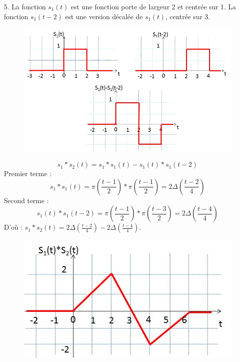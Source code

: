 \documentclass[11pt]{report}
\begin{document}
	5. La fonction $s_{1}(t)$ est une fonction porte de largeur 2 et centrée sur 1. La fonction $s_{1}(t-2)$ est une version décalée de $s_{1}(t)$, centrée sur 3.
	
	\begin{figure}[h!]
		\centering
		\includegraphics[scale=0.6]{images/TD_7_exo6.jpg} 
	\end{figure}

	\begin{equation*}
	s_{1}*s_{2}(t)=s_{1}*s_{1}(t)-s_{1}(t)*s_{1}(t-2)
	\end{equation*}
	Premier terme : 
	\begin{equation*}
	s_{1}*s_{1}(t)=\pi(\frac{t-1}{2})*\pi(\frac{t-1}{2})=2\Delta(\frac{t-2}{4})
	\end{equation*}
	Second terme : 
	\begin{equation*}
	s_{1}(t)*s_{1}(t-2) = \pi(\frac{t-1}{2})*\pi(\frac{t-3}{2})=2\Delta(\frac{t-4}{4})
	\end{equation*}
	D'où : $s_{1}*s_{2}(t)=2\Delta(\frac{t-2}{4})-2\Delta(\frac{t-4}{4})$.
	
	\begin{figure}[h!]
		\centering
		\includegraphics[scale=0.6]{images/TD7_exo6_2.jpg} 
	\end{figure}
	
\end{document}

